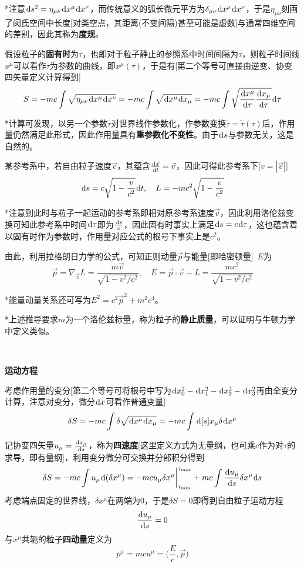 \documentclass[a4paper,UTF8,fontset=windows]{ctexart}
\newcommand*{\dr}{\hspace{0.07em}\mathrm{d}}
\newcommand*{\vps}{\vec{p}}
\newcommand*{\vvs}{\vec{v}}
\newcommand*{\vx}{\vec{x}}
\newcommand*{\dt}[2][t]{\frac{\dr #2}{\dr #1}}
\begin{document}
*注意$\dr s^2=\eta_{\mu\nu}\dr x^\mu\dr x^\nu$，而传统意义的弧长微元平方为$\delta_{\mu\nu}\dr x^\mu\dr x^\nu$，于是$\eta_{\mu\nu}$刻画了闵氏空间中长度[对类空点，其距离(不变间隔)甚至可能是虚数]与通常四维空间的差别，因此其称为\textbf{度规}。

假设粒子的\textbf{固有时}为$\tau$，也即对于粒子静止的参照系中时间间隔为$\tau$，则粒子时间线$x^\mu$可以看作$\tau$为参数的曲线，即$x^\mu(\tau)$，于是有[第二个等号可直接由逆变、协变四矢量定义计算得到]
$$S=-mc\int\sqrt{\eta_{\mu\nu}\dr x^\mu\dr x^\nu}=-mc\int\sqrt{\dr x^\mu\dr x_\mu}=-mc\int\sqrt{\dt[\tau]{x^\mu}\dt[\tau]{x_\mu}}\dr\tau$$

*计算可发现，以另一个参数$\tilde{\tau}$对世界线作参数化，作参数变换$\tilde{\tau}=\tilde{\tau}(\tau)$后，作用量仍然满足此形式，因此作用量具有\textbf{重参数化不变性}。由于$\dr s$与参数无关，这是自然的。

某参考系中，若自由粒子速度$\vvs$，其蕴含$\dt{\vx}=\vvs$，因此可得此参考系下[$v=|\vvs|$]
$$\dr s=c\sqrt{1-\frac{v}{c^2}}\dr t,\quad L=-mc^2\sqrt{1-\frac{v}{c^2}}$$

*注意到此时与粒子一起运动的参考系即相对原参考系速度$\vvs$，因此利用洛伦兹变换可知此参考系中时间$\dr\tau$即为$\frac{\dr s}{c}$，因此固有时事实上满足$\dr s=c\dr\tau$，这也蕴含着以固有时作为参数时，作用量对应公式的根号下事实上是$c^2$。

由此，利用拉格朗日力学的公式，可知正则动量$\vps$与能量[即哈密顿量]\ $E$为
$$\vps=\nabla_{\vvs}L=\frac{m\vvs}{\sqrt{1-v^2/c^2}},\quad E=\vps\cdot\vvs-L=\frac{mc^2}{\sqrt{1-v^2/c^2}}$$

*能量动量关系还可写为$E^2=c^2\vps^2+m^2c^4$。

*上述推导要求$m$为一个洛伦兹标量，称为粒子的\textbf{静止质量}，可以证明与牛顿力学中定义类似。

\

\textbf{运动方程}

考虑作用量的变分[第二个等号可将根号中写为$\dr x_0^2-\dr x_1^2-\dr x_2^2-\dr x_3^2$再由全变分计算，注意对变分，微分$\dr x$可看作普通变量]
$$\delta S=-mc\int\delta\sqrt{\dr x^\mu\dr x_\mu}=-mc\int\dr[s]{x_\mu\delta\dr x^\mu}$$

记协变四矢量$u_\mu=\dt[s]{x_\mu}$，称为\textbf{四速度}[这里定义方式为无量纲，也可乘$c$作为对$\tau$的求导，即有量纲]，利用变分微分可交换并分部积分得到
$$\delta S=-mc\int u_\mu\dr(\delta x^\mu)=-mcu_\mu\delta x^\mu\bigg|^{\tau_{\max}}_{\tau_{\min}}+mc\int\dt[s]{u_\mu}\delta x^\mu\dr s$$
考虑端点固定的世界线，$\delta x^\mu$在两端为0，于是$\delta S=0$即得到自由粒子运动方程
$$\frac{\dr u_\mu}{\dr s}=0$$
与$x^\mu$共轭的粒子\textbf{四动量}定义为
$$p^\mu=mc u^\mu=\bigg(\frac{E}{c},\vps\bigg)$$
\end{document}
